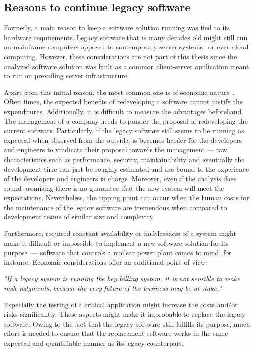 \documentclass[12pt,a4paper]{report}
\begin{document}
\subsection{Reasons to continue legacy software} \label{sub-sect:continue-legacy}

Formerly, a main reason to keep a software solution running was tied to its
hardware requirements. Legacy software that is many decades old might still
run on mainframe computers opposed to contemporary server systems~\cite{schneidewind-preserve-or-redesign}
or even cloud computing. However, these considerations are not part of this thesis
since the analyzed software solution was built as a common client-server application
meant to run on prevailing server infrastructure.

Apart from this initial reason, the most common one is of economic nature~\cite{schneidewind-preserve-or-redesign}.
Often times, the expected benefits of redeveloping a software cannot justify the expenditures.
Additionally, it is difficult to measure the advantages beforehand. The management
of a company needs to ponder the proposal of redeveloping the current software.
Particularly, if the legacy software still seems to be running as expected when observed
from the outside, is becomes harder for the developers and engineers to vindicate
their proposal towards the management --- raw characteristics such as performance,
security, maintainability and eventually the development time can just be roughly estimated and
are bound to the experience of the developers and engineers in charge.
Moreover, even if the analysis does sound promising there is no guarantee that the new system
will meet the expectations. Nevertheless, the tipping point can occur when the human costs for the maintenance
of the legacy software are tremendous when compared to development teams of similar size and complexity.

Furthermore, required constant availability or faultlessness of a system might make it
difficult or impossible to implement a new software solution for its purpose~\cn ---
software that controls a nuclear power plant comes to mind, for instance.
Economic considerations offer an additional point of view:
\begin{displayquote}
\emph{"If a legacy system is running the key billing system, it is not sensible
to make rash judgments, because the very future of the business may be at stake."}~\cite{bennett-coping-legacy}
\end{displayquote}
Especially the testing of a critical application might increase the costs
and/or risks significantly. These aspects might make it improbable to replace
the legacy software. Owing to the fact that the legacy software still fulfills
its purpose, much effort is needed to ensure that the replacement software works
in the same expected and quantifiable manner as its legacy counterpart.
\end{document}
